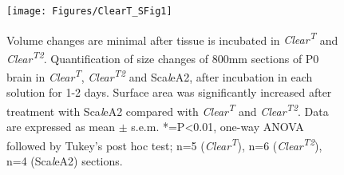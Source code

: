 \begin{figure}[hbtp]
    \begin{center}
        \texttt{[image: Figures/ClearT\_SFig1]}
        \caption[Volume changes are minimal after tissue is incubated in \emph{Clear\textsuperscript{T}} and \emph{Clear\textsuperscript{T2}}.]
        {Volume changes are minimal after tissue is incubated in \emph{Clear\textsuperscript{T}} and \emph{Clear\textsuperscript{T2}}.
        Quantification of size changes of 800mm sections of P0 brain in \emph{Clear\textsuperscript{T}}, \emph{Clear\textsuperscript{T2}} and Sca\emph{l}eA2, after incubation in each solution for 1-2 days.
        Surface area was significantly increased after treatment with Sca\emph{l}eA2 compared with \emph{Clear\textsuperscript{T}} and \emph{Clear\textsuperscript{T2}}.
        Data are expressed as mean $\pm$ s.e.m.
        *=P<0.01, one-way ANOVA followed by Tukey’s post hoc test; n=5 (\emph{Clear\textsuperscript{T}}), n=6 (\emph{Clear\textsuperscript{T2}}), n=4 (Sca\emph{l}eA2) sections.
        }
        \label{ClearT_SFig1}
    \end{center}
\end{figure}
